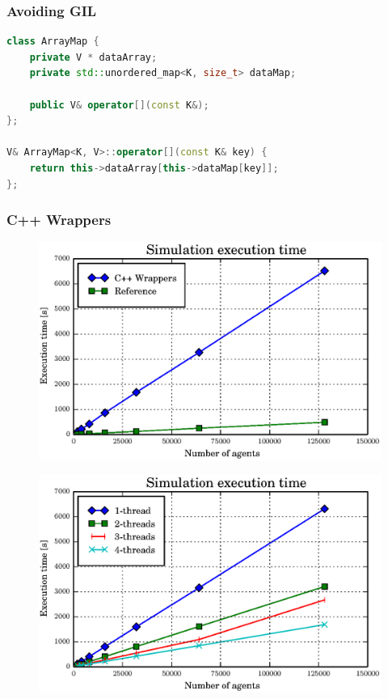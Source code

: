 \documentclass[t]{beamer}
\begin{document}
\begin{frame}[fragile,c]
\frametitle{\huge Avoiding GIL}
\begin{lstlisting}[language=c++]
class ArrayMap {
    private V * dataArray;
    private std::unordered_map<K, size_t> dataMap;

    public V& operator[](const K&);
};

V& ArrayMap<K, V>::operator[](const K& key) {
    return this->dataArray[this->dataMap[key]];
};
\end{lstlisting}
\end{frame}


\begin{frame}[c]
	\frametitle{C++ Wrappers}
	\begin{figure}[H]
	  \begin{center}
	    \includegraphics[width=0.9\columnwidth]{graphs/gil-free-perf.eps}
	  \end{center}
	\end{figure}
\end{frame}


\begin{frame}[c]
	\begin{figure}[H]
	  \begin{center}
	    \includegraphics[width=\columnwidth]{graphs/gil-free-multi-4-perf.eps}
	  \end{center}
	\end{figure}
\end{frame}
\end{document}
